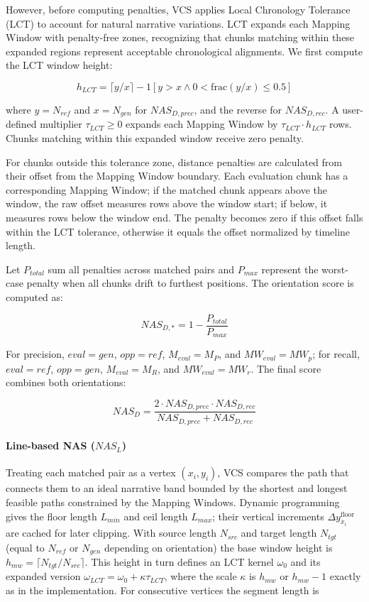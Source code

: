 \documentclass[letterpaper]{article} %
\begin{document}
However, before computing penalties, VCS applies Local Chronology Tolerance (LCT) to account for natural narrative variations. LCT expands each Mapping Window with penalty-free zones, recognizing that chunks matching within these expanded regions represent acceptable chronological alignments. We first compute the LCT window height:

\begin{equation}
h_{LCT} = \lceil y/x \rceil - 1[y > x \land 0 < \text{frac}(y/x) \leq 0.5]
\end{equation}

where $y = N_{ref}$ and $x = N_{gen}$ for $NAS_{D,prec}$, and the reverse for $NAS_{D,rec}$. A user-defined multiplier $\tau_{LCT} \geq 0$ expands each Mapping Window by $\tau_{LCT} \cdot h_{LCT}$ rows. Chunks matching within this expanded window receive zero penalty.

For chunks outside this tolerance zone, distance penalties are calculated from their offset from the Mapping Window boundary. Each evaluation chunk has a corresponding Mapping Window; if the matched chunk appears above the window, the raw offset measures rows above the window start; if below, it measures rows below the window end. The penalty becomes zero if this offset falls within the LCT tolerance, otherwise it equals the offset normalized by timeline length.

Let $P_{total}$ sum all penalties across matched pairs and $P_{max}$ represent the worst-case penalty when all chunks drift to furthest positions. The orientation score is computed as:

\begin{equation}
NAS_{D,*} = 1 - \frac{P_{total}}{P_{max}}
\end{equation}

For precision, $eval = gen$, $opp = ref$, $M_{eval} = M_P$, and $MW_{eval} = MW_p$; for recall, $eval = ref$, $opp = gen$, $M_{eval} = M_R$, and $MW_{eval} = MW_r$. The final score combines both orientations:

\begin{equation}
NAS_D = \frac{2 \cdot NAS_{D,prec} \cdot NAS_{D,rec}}{NAS_{D,prec} + NAS_{D,rec}}
\end{equation}

\paragraph{Line-based NAS ($NAS_L$)}
Treating each matched pair as a vertex $(x_i, y_i)$, VCS compares the path that connects them to an ideal narrative band bounded by the shortest and longest feasible paths constrained by the Mapping Windows. Dynamic programming gives the floor length $L_{min}$ and ceil length $L_{max}$; their vertical increments $\Delta y_{x_i}^{\text{floor}}$ are cached for later clipping. With source length $N_{src}$ and target length $N_{tgt}$ (equal to $N_{ref}$ or $N_{gen}$ depending on orientation) the base window height is $h_{mw} = \lceil N_{tgt}/N_{src} \rceil$. This height in turn defines an LCT kernel $\omega_0$ and its expanded version $\omega_{LCT} = \omega_0 + \kappa \tau_{LCT}$, where the scale $\kappa$ is $h_{mw}$ or $h_{mw} - 1$ exactly as in the implementation. For consecutive vertices the segment length is
\end{document}
